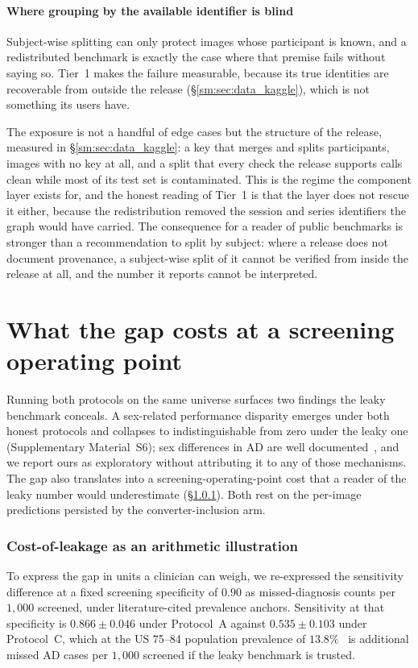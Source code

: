 \documentclass[11pt]{article}
\begin{document}
\paragraph{Where grouping by the available identifier is blind}
\label{sm:sec:subject_inference_failure}
Subject-wise splitting can only protect images whose participant is
known, and a redistributed benchmark is exactly the case where that
premise fails without saying so. Tier~1 makes the failure measurable,
because its true identities are recoverable from outside the release
(\S\ref{sm:sec:data_kaggle}), which is not something its users have.

The exposure is not a handful of edge cases but the structure of the
release, measured in \S\ref{sm:sec:data_kaggle}: a key that merges and
splits participants, images with no key at all, and a split that every
check the release supports calls clean while most of its test set is
contaminated. This is the regime the component layer exists for, and
the honest reading of Tier~1 is that the layer does not rescue it
either, because the redistribution removed the session and series
identifiers the graph would have carried. The consequence for a reader
of public benchmarks is stronger than a recommendation to split by
subject: where a release does not document provenance, a subject-wise
split of it cannot be verified from inside the release at all, and the
number it reports cannot be interpreted.



\section{What the gap costs at a screening operating point}
\label{sm:sec:adni_subgroup}

Running both protocols on the same universe surfaces two findings the leaky
benchmark conceals. A sex-related performance disparity emerges under both
honest protocols and collapses to indistinguishable from zero under the leaky
one (Supplementary Material~S6); sex differences in AD are well
documented~\cite{hua2010sex,sundermann2016female,mielke2014clinical}, and we
report ours as exploratory without attributing it to any of those mechanisms.
The gap also translates into a screening-operating-point cost that a reader of
the leaky number would underestimate (\S\ref{sm:sec:adni_cost_of_leakage}). Both
rest on the per-image predictions persisted by the converter-inclusion arm.

\subsubsection{Cost-of-leakage as an arithmetic illustration}
\label{sm:sec:adni_cost_of_leakage}
To express the gap in units a clinician can weigh, we re-expressed the
sensitivity difference at a fixed screening specificity of $0.90$ as
missed-diagnosis counts per $1{,}000$ screened, under literature-cited
prevalence anchors. Sensitivity at that specificity is $0.866 \pm 0.046$
under Protocol~A against $0.535 \pm 0.103$ under Protocol~C, which at the
US 75--84 population prevalence of $13.8\%$~\cite{rajan2021} is
\MissedPerThousand{} additional missed AD cases per $1{,}000$ screened if
the leaky benchmark is trusted.
\end{document}
